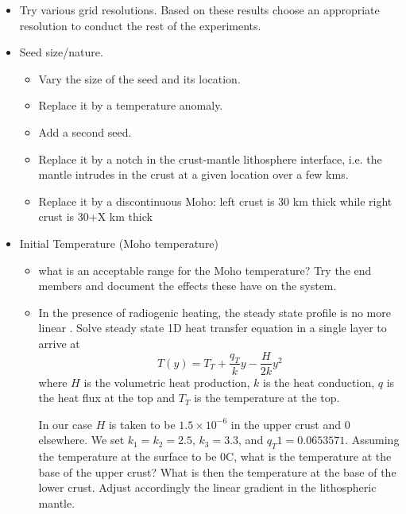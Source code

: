 \documentclass[a4paper]{article}
\begin{document}
\begin{itemize}
\item Try various grid resolutions. Based on these results choose an appropriate resolution to conduct the rest of the experiments.

\item Seed size/nature. 
   \begin{itemize}
   \item Vary the size of the seed and its location. 
   \item Replace it by a temperature anomaly. 
   \item Add a second seed.
   \item Replace it by a notch in the crust-mantle lithosphere interface, i.e. the mantle intrudes in the crust at a given location over a few kms. 
   \item Replace it by a discontinuous Moho: left crust is 30 km thick while right crust is 30+X km thick
   \end{itemize}

\item Initial Temperature (Moho temperature)
   \begin{itemize}
   \item what is an acceptable range for the Moho temperature? Try the end members and document the effects these have on the system.
   \item In the presence of radiogenic heating, the steady state profile is no more linear \cite{chap86}.
   Solve steady state 1D heat transfer equation in a single layer to arrive at 
   \[
   T(y) = T_T + \frac{q_T}{k} y - \frac{H}{2k}y^2
   \]
   where $H$ is the volumetric heat production, $k$ is the heat conduction, $q$ is the heat flux at the top and 
   $T_T$ is the temperature at the top.

   In our case $H$ is taken to be $1.5\times10^{-6}$ in the upper crust and 0 elsewhere. We set $k_1=k_2=2.5$, $k_3=3.3$, and $q_T1=0.0653571$. 
   Assuming the temperature at the surface to be 0C, what is the temperature at the base of the upper crust?
   What is then the temperature at the base of the lower crust. Adjust accordingly the linear gradient in the lithospheric mantle.


\end{itemize}


\end{itemize}
\end{document}
